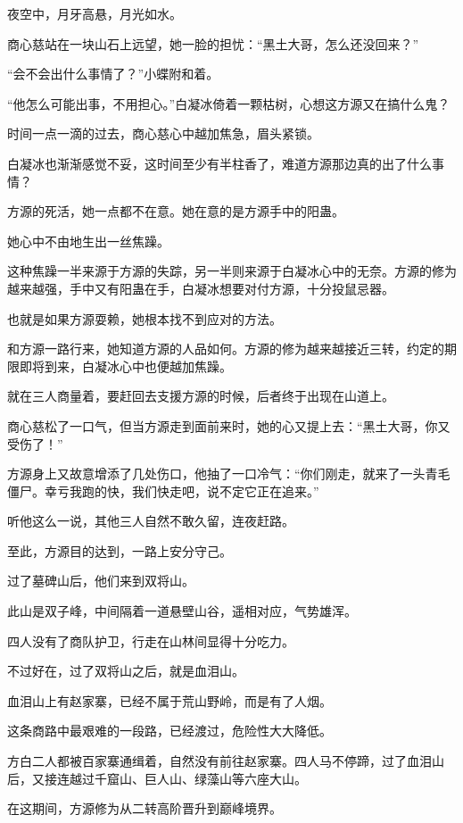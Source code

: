 
\begin{this_body}

夜空中，月牙高悬，月光如水。

商心慈站在一块山石上远望，她一脸的担忧：“黑土大哥，怎么还没回来？”

“会不会出什么事情了？”小蝶附和着。

“他怎么可能出事，不用担心。”白凝冰倚着一颗枯树，心想这方源又在搞什么鬼？

时间一点一滴的过去，商心慈心中越加焦急，眉头紧锁。

白凝冰也渐渐感觉不妥，这时间至少有半柱香了，难道方源那边真的出了什么事情？

方源的死活，她一点都不在意。她在意的是方源手中的阳蛊。

她心中不由地生出一丝焦躁。

这种焦躁一半来源于方源的失踪，另一半则来源于白凝冰心中的无奈。方源的修为越来越强，手中又有阳蛊在手，白凝冰想要对付方源，十分投鼠忌器。

也就是如果方源耍赖，她根本找不到应对的方法。

和方源一路行来，她知道方源的人品如何。方源的修为越来越接近三转，约定的期限即将到来，白凝冰心中也便越加焦躁。

就在三人商量着，要赶回去支援方源的时候，后者终于出现在山道上。

商心慈松了一口气，但当方源走到面前来时，她的心又提上去：“黑土大哥，你又受伤了！”

方源身上又故意增添了几处伤口，他抽了一口冷气：“你们刚走，就来了一头青毛僵尸。幸亏我跑的快，我们快走吧，说不定它正在追来。”

听他这么一说，其他三人自然不敢久留，连夜赶路。

至此，方源目的达到，一路上安分守己。

过了墓碑山后，他们来到双将山。

此山是双子峰，中间隔着一道悬壁山谷，遥相对应，气势雄浑。

四人没有了商队护卫，行走在山林间显得十分吃力。

不过好在，过了双将山之后，就是血泪山。

血泪山上有赵家寨，已经不属于荒山野岭，而是有了人烟。

这条商路中最艰难的一段路，已经渡过，危险性大大降低。

方白二人都被百家寨通缉着，自然没有前往赵家寨。四人马不停蹄，过了血泪山后，又接连越过千窟山、巨人山、绿藻山等六座大山。

在这期间，方源修为从二转高阶晋升到巅峰境界。


\end{this_body}
